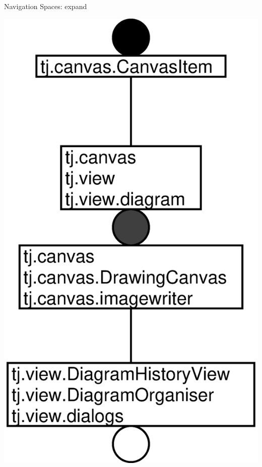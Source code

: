 \documentclass[pdf,prettybox]{prosper}
\begin{document}
\begin{slide}{Navigation Spaces: expand}
 \begin{center}
  \includegraphics[height=0.8 \textheight]{img/callgraph-3.eps}
 \end{center}
\end{slide}
\end{document}
